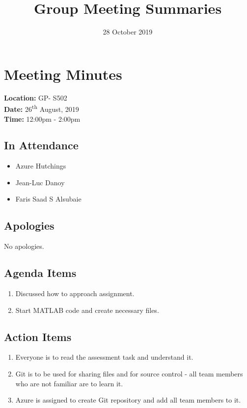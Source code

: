 \documentclass{article}
\title{Group Meeting Summaries}
\date{28 October 2019}
\begin{document}
\begin{titlepage}
\maketitle
\end{titlepage}

\section{Meeting Minutes}
\textbf{Location:} GP- S502 \\
\textbf{Date:} 26\textsuperscript{th} August, 2019 \\
\textbf{Time:} 12:00pm - 2:00pm

\subsection*{In Attendance}
\begin{itemize}
\item Azure Hutchings
\item Jean-Luc Danoy
\item Faris Saad S Alsubaie
\end{itemize}

\subsection*{Apologies}
No apologies. 

\subsection*{Agenda Items}
\begin{enumerate}
\item Discussed how to approach assignment.
\item Start MATLAB code and create necessary files.
\end{enumerate}

\subsection*{Action Items}
\begin{enumerate}
\item Everyone is to read the assessment task and understand it.
\item Git is to be used for sharing files and for source control - all team members who are not familiar are to learn it.
\item Azure is assigned to create Git repository and add all team members to it.
\end{enumerate}
\end{document}
